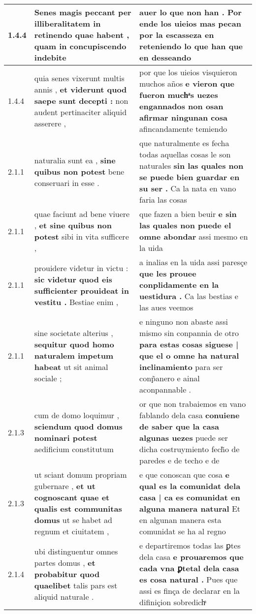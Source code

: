\begin{tabular}{|p{1cm}|p{6.5cm}|p{6.5cm}|}
1.4.4 & Senes magis peccant \textbf{ per illiberalitatem in retinendo quae habent , } quam in concupiscendo indebite & auer lo que non han . \textbf{ Por ende los uieios mas pecan por la escasseza en reteniendo lo que han que en } desseando \\\hline
1.4.4 & quia senes vixerunt multis annis , \textbf{ et viderunt quod saepe sunt decepti : } non audent pertinaciter aliquid asserere , & por que los uieios visquieron muchos años \textbf{ e vieron que fueron muchͣs uezes engannados non osan afirmar ningunan cosa } afincandamente temiendo \\\hline
2.1.1 & naturalia sunt ea , \textbf{ sine quibus non potest } bene conseruari in esse . & que naturalmente es fecha todas aquellas cosas le son naturales \textbf{ sin las quales non se puede bien guardar en su ser . } Ca la nata en vano faria las cosas \\\hline
2.1.1 & quae faciunt ad bene viuere , \textbf{ et sine quibus non potest } sibi in vita sufficere , & que fazen a bien beuir \textbf{ e sin las quales non puede el omne abondar } assi mesmo en la uida \\\hline
2.1.1 & prouidere videtur in victu : \textbf{ sic videtur quod eis sufficienter prouideat in vestitu . } Bestiae enim , & a inalias en la uida assi paresçe \textbf{ que les prouee conplidamente en la uestidura . } Ca las bestias e las aues veemos \\\hline
2.1.1 & sine societate alterius , \textbf{ sequitur quod homo naturalem impetum habeat } ut sit animal sociale ; & e ninguno non abaste assi mismo sin conpannia de otro \textbf{ para estas cosas siguese | que el o omne ha natural inclinamiento } para ser conp̃anero e ainal aconpannable . \\\hline
2.1.3 & cum de domo loquimur , \textbf{ sciendum quod domus nominari potest } aedificium constitutum & or que non trabaiemos en vano fablando dela casa \textbf{ conuiene de saber que la casa algunas uezes } puede ser dicha costruymiento fech̃o de paredes e de techo e de \\\hline
2.1.3 & ut sciant domum propriam gubernare , \textbf{ et ut cognoscant quae et qualis est communitas domus } ut se habet ad regnum et ciuitatem , & e que conoscan que cosa \textbf{ e qual es la comunidat dela casa | ca es comunidat en alguna manera natural } Et en algunan manera esta comunidat se ha al regno \\\hline
2.1.4 & ubi distinguentur omnes partes domus , \textbf{ et probabitur quod quaelibet } talis pars est aliquid naturale . & e departiremos todas las ꝑtes dela casa \textbf{ e prouaremos que cada vna ꝑtetal dela casa es cosa natural . } Pues que assi es finça de declarar en la difiniçion sobredichͣ \\\hline

\end{tabular}
